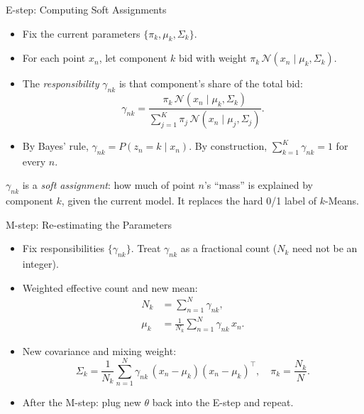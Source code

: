 \begin{frame}{E-step: Computing Soft Assignments}
\begin{itemize}
  \item Fix the current parameters $\{\pi_k, \mu_k, \Sigma_k\}$.
  \item For each point $x_n$, let component $k$ bid with weight $\pi_k\,\mathcal{N}(x_n \mid \mu_k, \Sigma_k)$.
  \pause
  \item The \emph{responsibility} $\gamma_{nk}$ is that component's share of the total bid:
  \begin{equation}
    \gamma_{nk}
    = \frac{\pi_k\,\mathcal{N}(x_n \mid \mu_k, \Sigma_k)}
           {\displaystyle\sum_{j=1}^{K}\pi_j\,\mathcal{N}(x_n \mid \mu_j, \Sigma_j)}.
    \label{eq:responsibility}
  \end{equation}
  \pause
  \item By Bayes' rule, $\gamma_{nk} = P(z_n = k \mid x_n)$.  By construction, $\sum_{k=1}^K \gamma_{nk} = 1$ for every $n$.
\end{itemize}
\pause
\begin{rldefinition}
  $\gamma_{nk}$ is a \emph{soft assignment}: how much of point $n$'s ``mass'' is explained by component $k$, given the current model.  It replaces the hard 0/1 label of $k$-Means.
\end{rldefinition}
\end{frame}

\begin{frame}{M-step: Re-estimating the Parameters}
\begin{itemize}
  \item Fix responsibilities $\{\gamma_{nk}\}$.  Treat $\gamma_{nk}$ as a fractional count ($N_k$ need not be an integer).
  \pause
  \item Weighted effective count and new mean:
  \begin{align}
    N_k &= \sum_{n=1}^{N} \gamma_{nk}, \nonumber \\
    \mu_k &= \frac{1}{N_k}\sum_{n=1}^{N} \gamma_{nk}\, x_n. \label{eq:m-step-mean}
  \end{align}
  \pause
  \item New covariance and mixing weight:
  \begin{equation}
    \Sigma_k = \frac{1}{N_k}\sum_{n=1}^{N} \gamma_{nk}\,(x_n-\mu_k)(x_n-\mu_k)^{\!\top},
    \quad
    \pi_k = \frac{N_k}{N}.
    \label{eq:m-step-cov}
  \end{equation}
  \pause
  \item After the M-step: plug new $\theta$ back into the E-step and repeat.
\end{itemize}
\end{frame}

